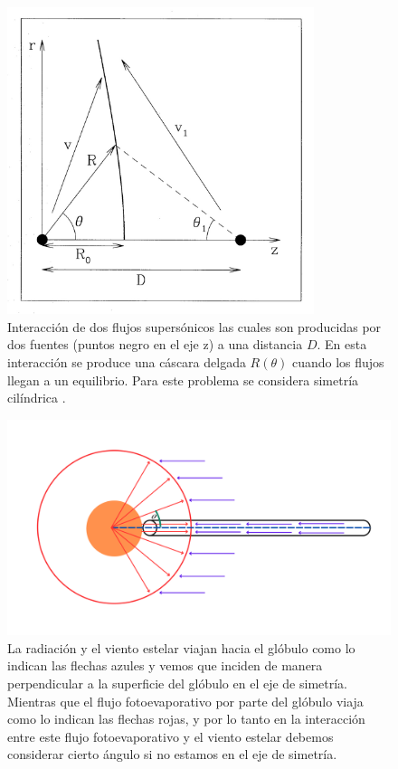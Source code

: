 \documentclass{book}
\begin{document}
\begin{figure}[htb]
    \centering    \includegraphics[width=0.8\textwidth]{images Chapter 2/C2_Canto.jpg}
    \caption{Interacción de dos flujos supersónicos las cuales son producidas por dos fuentes (puntos negro en el eje z) a una distancia $D$. En esta interacción se produce una cáscara delgada $R(\theta)$ cuando los flujos llegan a un equilibrio. Para este problema se considera simetría cilíndrica \citep{Canto:1996}.}
    \label{fig:Canto1}
\end{figure}

\begin{figure}[htb]
    \centering    \includegraphics[width=\textwidth]{artesanales/ImgFi01-2.pdf}
    \caption{La radiación y el viento estelar viajan hacia el glóbulo como lo indican las flechas azules y vemos que inciden de manera perpendicular a la superficie del glóbulo en el eje de simetría. Mientras que el flujo fotoevaporativo por parte del glóbulo viaja como lo indican las flechas rojas, y por lo tanto en la interacción entre este flujo fotoevaporativo y el viento estelar debemos considerar cierto ángulo si no estamos en el eje de simetría.}
    \label{fig:cilindross}
\end{figure}
\end{document}
